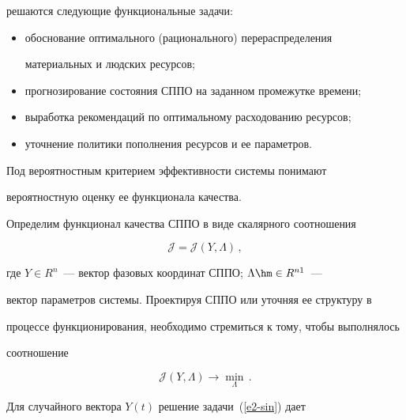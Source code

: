 решаются следующие функциональные задачи:

     \begin{itemize}

\item обоснование оптимального (рационального) перераспределения

материальных и людских ресурсов;

\item прогнозирование состояния СППО на заданном промежутке времени;

\item выработка рекомендаций по оптимальному расходованию ресурсов;

\item уточнение политики пополнения ресурсов и ее параметров.

\end{itemize}





     Под вероятностным критерием эффективности системы понимают

вероятностную оценку ее функционала качества.



     Определим функционал качества СППО в виде скалярного соотношения

     \begin{equation*}

     \mathcal{J} = \mathcal{J}(Y,\Lambda)\,,


     \end{equation*}

где $Y\in R^n$~--- вектор фазовых координат СППО; $\Lambda\hm\in R^{n1}$~---

вектор параметров системы. Проектируя СППО или уточняя ее структуру в

процессе функционирования, необходимо стремиться к тому, чтобы выполнялось

соотношение

\begin{equation}

\mathcal{J}(Y,\Lambda) \to \min\limits_\Lambda\,.

\label{e2-sin}

\end{equation}



     Для случайного вектора $Y(t)$ решение задачи~(\ref{e2-sin}) дает

